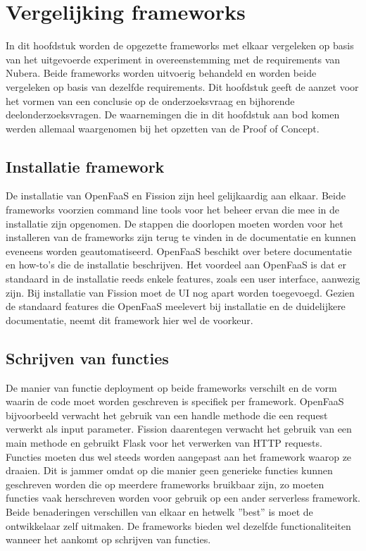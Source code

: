 \chapter{Vergelijking frameworks}
\label{ch:vergelijking-frameworks}
In dit hoofdstuk worden de opgezette frameworks met elkaar vergeleken op basis van het uitgevoerde experiment in overeenstemming met de requirements van Nubera. Beide frameworks worden uitvoerig behandeld en worden beide vergeleken op basis van dezelfde requirements. Dit hoofdstuk geeft de aanzet voor het vormen van een conclusie op de onderzoeksvraag en bijhorende deelonderzoeksvragen. De waarnemingen die in dit hoofdstuk aan bod komen werden allemaal waargenomen bij het opzetten van de Proof of Concept.

\section{Installatie framework}
\label{sec:vergelijking-installatie}
De installatie van OpenFaaS en Fission zijn heel gelijkaardig aan elkaar. Beide frameworks voorzien command line tools voor het beheer ervan die mee in de installatie zijn opgenomen. De stappen die doorlopen moeten worden voor het installeren van de frameworks zijn terug te vinden in de documentatie en kunnen eveneens worden geautomatiseerd. OpenFaaS beschikt over betere documentatie en how-to's die de installatie beschrijven. Het voordeel aan OpenFaaS is dat er standaard in de installatie reeds enkele features, zoals een user interface, aanwezig zijn. Bij installatie van Fission moet de UI nog apart worden toegevoegd. Gezien de standaard features die OpenFaaS meelevert bij installatie en de duidelijkere documentatie, neemt dit framework hier wel de voorkeur.

\section{Schrijven van functies}
De manier van functie deployment op beide frameworks verschilt en de vorm waarin de code moet worden geschreven is specifiek per framework. OpenFaaS bijvoorbeeld verwacht het gebruik van een handle methode die een request verwerkt als input parameter. Fission daarentegen verwacht het gebruik van een main methode en gebruikt Flask voor het verwerken van HTTP requests. Functies moeten dus wel steeds worden aangepast aan het framework waarop ze draaien. Dit is jammer omdat op die manier geen generieke functies kunnen geschreven worden die op meerdere frameworks bruikbaar zijn, zo moeten functies vaak herschreven worden voor gebruik op een ander serverless framework. Beide benaderingen verschillen van elkaar en hetwelk ''best'' is moet de ontwikkelaar zelf uitmaken. De frameworks bieden wel dezelfde functionaliteiten wanneer het aankomt op schrijven van functies.

